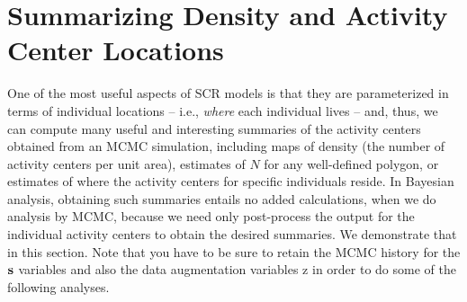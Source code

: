 \section{Summarizing Density and Activity Center Locations}

One of the most useful aspects of SCR models is that they are
parameterized in terms of individual locations -- i.e., {\it where}
each individual lives -- and, thus, we can compute many useful and
interesting summaries of the activity centers obtained from an MCMC
simulation, including maps of density (the number of activity centers
per unit area), estimates of $N$ for any well-defined polygon, or
estimates of where the activity centers for specific individuals
reside. In Bayesian analysis, obtaining such summaries entails no
added calculations,
 when we do analysis by MCMC, because we need only
post-process the output for the individual activity centers to obtain
the desired summaries. We demonstrate that in this section.
Note that you have to be sure to
retain the MCMC history for the ${\bf s}$
variables and also the data augmentation variables z in order to do
some of the following analyses.



